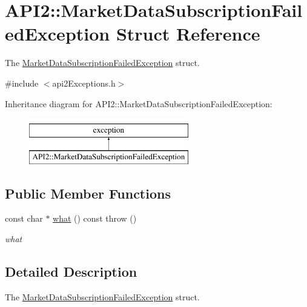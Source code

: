 \hypertarget{struct_a_p_i2_1_1_market_data_subscription_failed_exception}{\section{A\-P\-I2\-:\-:Market\-Data\-Subscription\-Failed\-Exception Struct Reference}
\label{struct_a_p_i2_1_1_market_data_subscription_failed_exception}
}


The \hyperlink{struct_a_p_i2_1_1_market_data_subscription_failed_exception}{Market\-Data\-Subscription\-Failed\-Exception} struct.  




{\ttfamily \#include $<$api2\-Exceptions.\-h$>$}

Inheritance diagram for A\-P\-I2\-:\-:Market\-Data\-Subscription\-Failed\-Exception\-:\begin{figure}[H]
\begin{center}
\leavevmode
\includegraphics[height=2.000000cm]{struct_a_p_i2_1_1_market_data_subscription_failed_exception}
\end{center}
\end{figure}
\subsection*{Public Member Functions}
\begin{DoxyCompactItemize}
\item 
const char $\ast$ \hyperlink{struct_a_p_i2_1_1_market_data_subscription_failed_exception_a45cbba09c414050a5d5af854895e3eac}{what} () const   throw ()
\begin{DoxyCompactList}\small\item\em what \end{DoxyCompactList}\end{DoxyCompactItemize}


\subsection{Detailed Description}
The \hyperlink{struct_a_p_i2_1_1_market_data_subscription_failed_exception}{Market\-Data\-Subscription\-Failed\-Exception} struct. 

